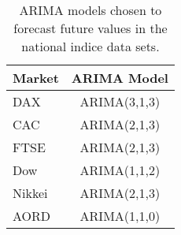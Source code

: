 \begin{table}[ht]
\centering
\caption[ARIMA models chosen for the indice data sets]{ARIMA models chosen to forecast future values in the national indice data sets.} 
\label{tab:chp_ts_arima_models}
\begin{tabular}{lc}
  \toprule Market & ARIMA Model \\ 
  \midrule DAX & ARIMA(3,1,3)                    \\ 
  CAC & ARIMA(2,1,3)                    \\ 
  FTSE & ARIMA(2,1,3)                    \\ 
  Dow & ARIMA(1,1,2)                    \\ 
  Nikkei & ARIMA(2,1,3)                    \\ 
  AORD & ARIMA(1,1,0)                    \\ 
   \bottomrule \end{tabular}
\end{table}
